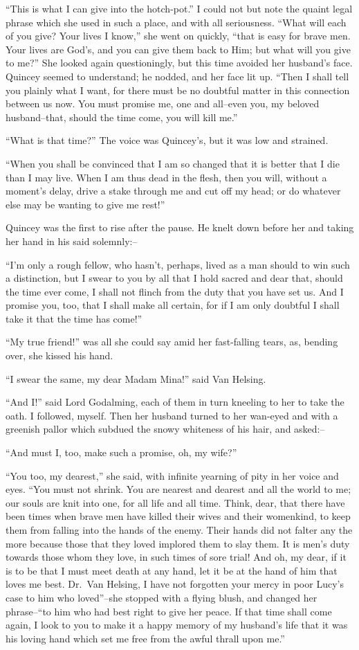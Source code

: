 \documentclass[12pt,openright]{book}
\begin{document}
“This is what I can give into the hotch-pot.” I could not but note the quaint legal phrase which she used in such a place, and with all seriousness. “What will each of you give? Your lives I know,” she went on quickly, “that is easy for brave men. Your lives are God’s, and you can give them back to Him; but what will you give to me?” She looked again questioningly, but this time avoided her husband’s face. Quincey seemed to understand; he nodded, and her face lit up. “Then I shall tell you plainly what I want, for there must be no doubtful matter in this connection between us now. You must promise me, one and all–even you, my beloved husband–that, should the time come, you will kill me.”

“What is that time?” The voice was Quincey’s, but it was low and strained.

“When you shall be convinced that I am so changed that it is better that I die than I may live. When I am thus dead in the flesh, then you will, without a moment’s delay, drive a stake through me and cut off my head; or do whatever else may be wanting to give me rest!”

Quincey was the first to rise after the pause. He knelt down before her and taking her hand in his said solemnly:–

“I’m only a rough fellow, who hasn’t, perhaps, lived as a man should to win such a distinction, but I swear to you by all that I hold sacred and dear that, should the time ever come, I shall not flinch from the duty that you have set us. And I promise you, too, that I shall make all certain, for if I am only doubtful I shall take it that the time has come!”

“My true friend!” was all she could say amid her fast-falling tears, as, bending over, she kissed his hand.

“I swear the same, my dear Madam Mina!” said Van Helsing.

“And I!” said Lord Godalming, each of them in turn kneeling to her to take the oath. I followed, myself. Then her husband turned to her wan-eyed and with a greenish pallor which subdued the snowy whiteness of his hair, and asked:–

“And must I, too, make such a promise, oh, my wife?”

“You too, my dearest,” she said, with infinite yearning of pity in her voice and eyes. “You must not shrink. You are nearest and dearest and all the world to me; our souls are knit into one, for all life and all time. Think, dear, that there have been times when brave men have killed their wives and their womenkind, to keep them from falling into the hands of the enemy. Their hands did not falter any the more because those that they loved implored them to slay them. It is men’s duty towards those whom they love, in such times of sore trial! And oh, my dear, if it is to be that I must meet death at any hand, let it be at the hand of him that loves me best. Dr. Van Helsing, I have not forgotten your mercy in poor Lucy’s case to him who loved”–she stopped with a flying blush, and changed her phrase–“to him who had best right to give her peace. If that time shall come again, I look to you to make it a happy memory of my husband’s life that it was his loving hand which set me free from the awful thrall upon me.”
\end{document}
